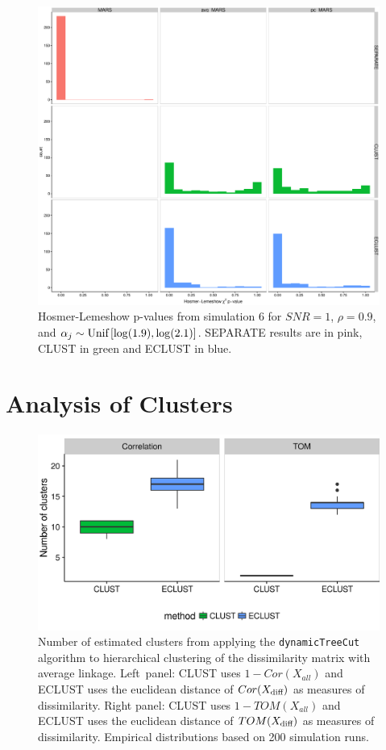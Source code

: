 \begin{appendices}
\begin{figure}[H]
	\centering\includegraphics[width=1\linewidth]{./figs/guillimin/results/figures/sim4-5-6-combined/calibration-pvalue_sim6.eps}
	\caption{Hosmer-Lemeshow p-values from simulation 6 for $SNR=1$, $\rho = 0.9$, and \mbox{$\alpha_{j} \sim \textrm{{Unif}}\left[\log(1.9), \log(2.1)\right]$}. SEPARATE results are in pink, CLUST in green and ECLUST in blue.}\label{fig:sim-calibrationhist6}
\end{figure}


\section{Analysis of Clusters}\label{ap:clusters}

\begin{figure}[H]
	\centering
	\includegraphics[scale=0.9, keepaspectratio]{./figs/figures-for-manuscript/nclusters.png}
	\caption{Number of estimated clusters from applying the \texttt{dynamicTreeCut} algorithm to hierarchical clustering of the dissimilarity matrix with average linkage. \mbox{Left panel}: CLUST uses $1-Cor(X_{all})$ and ECLUST uses the euclidean distance of $Cor(X_{\textrm{{diff}}})$ as measures of dissimilarity. Right panel: CLUST uses $1-TOM(X_{all})$ and ECLUST uses the euclidean distance of $TOM(X_{\textrm{{diff}}})$ as measures of dissimilarity. Empirical distributions based on 200 simulation runs.}
	\label{fig:compare_clusters}
\end{figure}



\end{appendices}
